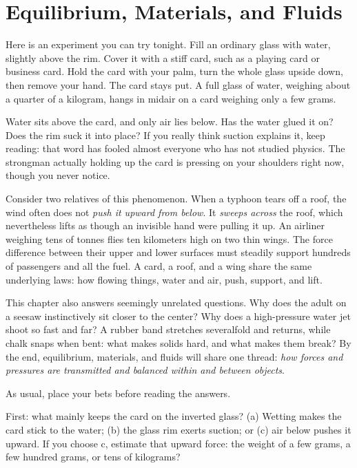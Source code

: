 \chapter{Equilibrium, Materials, and Fluids}


\begin{mainline}
Here is an experiment you can try tonight. Fill an ordinary glass with water, slightly above the rim. Cover it with a stiff card, such as a playing card or business card. Hold the card with your palm, turn the whole glass upside down, then remove your hand. The card stays put. A full glass of water, weighing about a quarter of a kilogram, hangs in midair on a card weighing only a few grams.

Water sits above the card, and only air lies below. Has the water glued it on? Does the rim suck it into place? If you really think suction explains it, keep reading: that word has fooled almost everyone who has not studied physics. The strongman actually holding up the card is pressing on your shoulders right now, though you never notice.

Consider two relatives of this phenomenon. When a typhoon tears off a roof, the wind often does not \emph{push it upward from below}. It \emph{sweeps across} the roof, which nevertheless lifts as though an invisible hand were pulling it up. An airliner weighing tens of tonnes flies ten kilometers high on two thin wings. The force difference between their upper and lower surfaces must steadily support hundreds of passengers and all the fuel. A card, a roof, and a wing share the same underlying laws: how flowing things, water and air, push, support, and lift.

This chapter also answers seemingly unrelated questions. Why does the adult on a seesaw instinctively sit closer to the center? Why does a high-pressure water jet shoot so fast and far? A rubber band stretches severalfold and returns, while chalk snaps when bent: what makes solids hard, and what makes them break? By the end, equilibrium, materials, and fluids will share one thread: \emph{how forces and pressures are transmitted and balanced within and between objects}.
\end{mainline}


As usual, place your bets before reading the answers.

First: what mainly keeps the card on the inverted glass? (a) Wetting makes the card stick to the water; (b) the glass rim exerts suction; or (c) air below pushes it upward. If you choose c, estimate that upward force: the weight of a few grams, a few hundred grams, or tens of kilograms?

